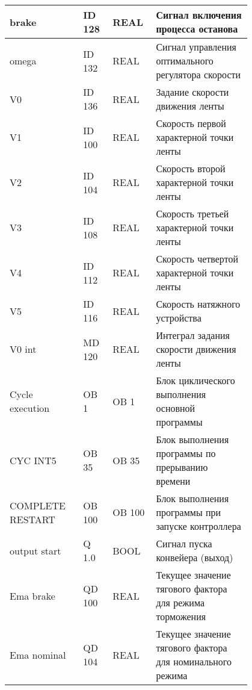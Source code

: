 \begin{table}[h!]

\begin{center}
\begin{tabular}{|p{0.25\linewidth}|p{0.1\linewidth}|p{0.1\linewidth}|p{0.35\linewidth}|} 
\hline
brake                    & ID 128 & REAL   & Сигнал включения процесса останова                           \\
\hline  
omega                    & ID 132 & REAL   & Сигнал управления оптимального регулятора скорости           \\
\hline  
V0                       & ID 136 & REAL   & Задание скорости движения ленты                              \\
\hline 
V1                       & ID 100 & REAL   & Скорость первой характерной точки ленты                      \\
\hline  
V2                       & ID 104 & REAL   & Скорость второй характерной точки ленты                      \\
\hline  
V3                       & ID 108 & REAL   & Скорость третьей характерной точки ленты                     \\
\hline  
V4                       & ID 112 & REAL   & Скорость четвертой характерной точки ленты                   \\
\hline  
V5                       & ID 116 & REAL   & Скорость натяжного устройства                                \\
\hline  
V0 int                   & MD 120 & REAL   & Интеграл задания скорости движения ленты                     \\
\hline  
Cycle execution          & OB 1   & OB 1   & Блок циклического выполнения основной программы              \\
\hline  
CYC INT5                 & OB 35  & OB 35  & Блок выполнения программы по прерыванию времени              \\
\hline  
COMPLETE RESTART         & OB 100 & OB 100 & Блок выполнения программы при запуске контроллера            \\
\hline  
output start             & Q  1.0 & BOOL   & Сигнал пуска конвейера (выход)                               \\
\hline  
Ema brake                & QD 100 & REAL   & Текущее значение тягового фактора для режима торможения      \\
\hline  
Ema nominal              & QD 104 & REAL   & Текущее значение тягового фактора для номинального режима    \\

\end{tabular}
\end{center}
\end{table}
